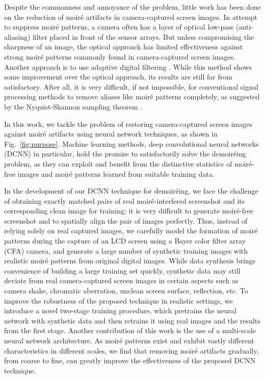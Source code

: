 \documentclass[10pt,twocolumn,letterpaper]{article}
\begin{document}
Despite the commonness and annoyance of the problem, little work has
been done on the reduction of moir\'e artifacts in camera-captured
screen images.  In attempt to suppress moir\'e patterns, a camera
often has a layer of optical low-pass (anti-aliasing) filter placed in
front of the sensor arrays.  But unless compromising the sharpness of
an image, the optical approach has limited effectiveness against
strong moir\'e patterns commonly found in camera-captured screen
images.  Another approach is to use adaptive digital filtering
\cite{yang2017demoireing}.  While this method shows some improvement
over the optical approach, its results are still far from
satisfactory.  After all, it is very difficult, if not impossible, for
conventional signal processing methods to remove aliases like moir\'e
patterns completely, as suggested by the Nyquist-Shannon sampling
theorem \cite{shannon1949communication}.

In this work, we tackle the problem of restoring camera-captured
screen images against moir\'e artifacts using neural network
techniques, as shown in Fig.~\ref{fig:purpose}.  Machine learning
methods, deep convolutional neural networks (DCNN) in particular, hold
the promise to satisfactorily solve the demoir\'eing problem, as they
can exploit and benefit from the distinctive statistics of
moir\'e-free images and moir\'e patterns learned from suitable
training data.

In the development of our DCNN technique for demoir\'eing, we face the
challenge of obtaining exactly matched pairs of real
moir\'e-interfered screenshot and its corresponding clean image for
training; it is very difficult to generate moir\'e-free screenshot and
to spatially align the pair of images perfectly.  Thus, instead of
relying solely on real captured images, we carefully model the
formation of moir\'e patterns during the capture of an LCD screen
using a Bayer color filter array (CFA) camera, and generate a large
number of synthetic training images with realistic moir\'e patterns
from original digital images.  While data synthesis brings convenience
of building a large training set quickly, synthetic data may still
deviate from real camera-captured screen images in certain aspects
such as camera shake, chromatic aberration, unclean screen surface,
reflection, etc.  To improve the robustness of the proposed technique
in realistic settings, we introduce a novel two-stage training
procedure, which pretrains the neural network with synthetic data and
then retrains it using real images and the results from the first
stage.  Another contribution of this work is the use of a multi-scale
neural network architecture.  As moir\'e patterns exist and exhibit
vastly different characteristics in different scales, we find that
removing moir\'e artifacts gradually, from coarse to fine, can greatly
improve the effectiveness of the proposed DCNN technique.
\end{document}
